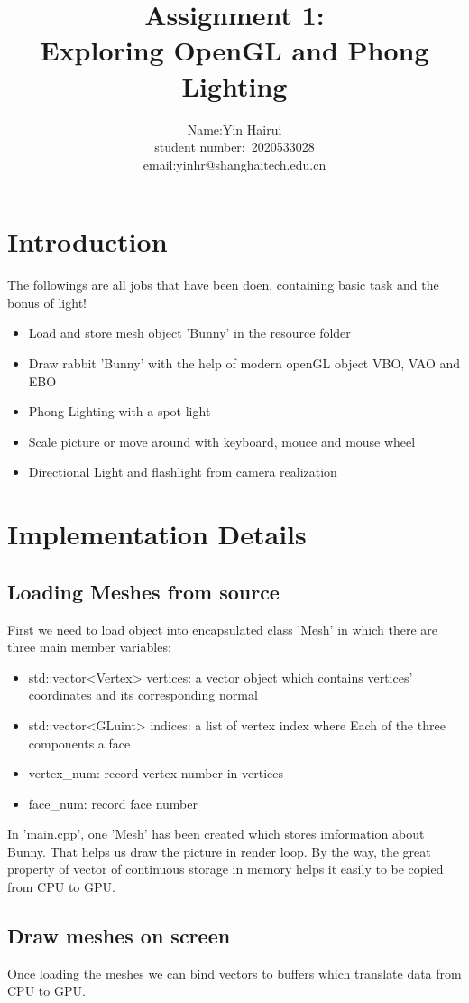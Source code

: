 \documentclass[acmtog]{acmart}
\title{Assignment 1:\\ {Exploring OpenGL and Phong Lighting}}
\author{Name:\quad Yin Hairui  \\ student number:\ 2020533028
\\email:\quad yinhr@shanghaitech.edu.cn}
\begin{document}
\maketitle

\vspace*{2 ex}

\section{Introduction}
The followings are all jobs that have been doen, containing basic task and the bonus of light!
\begin{itemize}
	\item Load and store mesh object 'Bunny' in the resource folder
	\item Draw rabbit 'Bunny' with the help of modern openGL object VBO, VAO and EBO
	\item Phong Lighting with a spot light
	\item Scale picture or move around with keyboard, mouce and mouse wheel
	\item Directional Light and flashlight from camera realization
\end{itemize}
\section{Implementation Details}
\subsection{Loading Meshes from source}
First we need to load object into encapsulated class 'Mesh' in which there are three main member variables:
\begin{itemize}
	\item std::vector<Vertex> vertices: a vector object which contains vertices' coordinates and its corresponding normal
	\item std::vector<GLuint> indices: a list of vertex index where Each of the three components a face
	\item vertex\_num: record vertex number in vertices
	\item face\_num: record face number
\end{itemize}
In 'main.cpp', one 'Mesh' has been created which stores imformation about Bunny. That helps us draw the picture in render loop. 
By the way, the great property of vector of continuous storage in memory helps it easily to be copied from CPU to GPU.
\subsection{Draw meshes on screen}
Once loading the meshes we can bind vectors to buffers which translate data from CPU to GPU.
\end{document}
